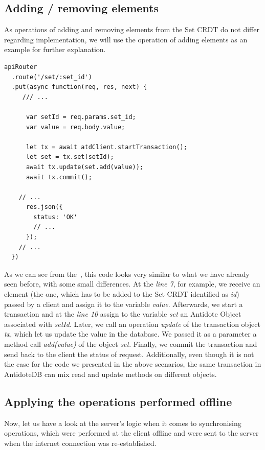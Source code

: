 \subsection*{Adding / removing elements}

As operations of adding and removing elements from the Set CRDT do not differ regarding implementation, we will use the operation of adding elements as an example for further explanation.

\begin{lstlisting}[caption={Code for applying an \textit{add} operation to a Set CRDT.}, label={lst:dev2}]
apiRouter
  .route('/set/:set_id')
  .put(async function(req, res, next) {
     /// ...

      var setId = req.params.set_id;
      var value = req.body.value;      

      let tx = await atdClient.startTransaction();
      let set = tx.set(setId);
      await tx.update(set.add(value));
      await tx.commit();

    // ...
      res.json({
        status: 'OK'
        // ...
      });
    // ...
  })
\end{lstlisting} 

As we can see from the~, this code looks very similar to what we have already seen before, with some small differences. At the \textit{line 7}, for example, we receive an element (the one, which has to be added to the Set CRDT identified as \textit{id}) passed by a client and assign it to the variable \textit{value}. Afterwards, we start a transaction and at the \textit{line 10} assign to the variable \textit{set} an Antidote Object associated with \textit{setId}. Later, we call an operation \textit{update} of the transaction object \textit{tx}, which let us update the value in the database. We passed it as a parameter a method call \textit{add(value)} of the object \textit{set}. Finally, we commit the transaction and send back to the client the status of request. Additionally, even though it is not the case for the code we presented in the above scenarios, the same transaction in AntidoteDB can mix read and update methods on different objects.

\subsection*{Applying the operations performed offline}

Now, let us have a look at the server's logic when it comes to synchronising operations, which were performed at the client offline and were sent to the server when the internet connection was re-established.

